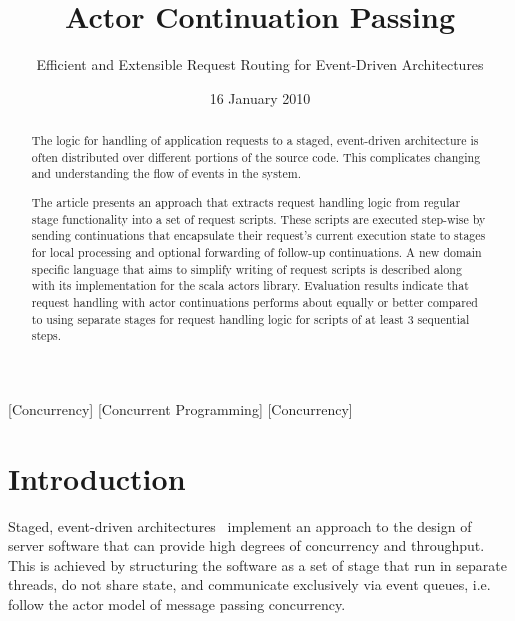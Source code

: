\documentclass[preprint]{sigplanconf}
\begin{document}
\title{Actor Continuation Passing}
\subtitle{Efficient and Extensible Request Routing for Event-Driven Architectures}


\date{16 January 2010}

\maketitle

\begin{abstract} The logic for handling of application requests to a staged, event-driven
architecture is often distributed over different portions of the source code. This complicates
changing and understanding the flow of events in the system.

The article presents an approach that extracts request handling logic from regular stage
functionality into a set of request scripts. These scripts are executed step-wise by sending
continuations that encapsulate their request's current execution state to stages for local
processing and optional forwarding of follow-up continuations. A new domain specific language that
aims to simplify writing of request scripts is described along with its implementation for the scala
actors library. Evaluation results indicate that request handling with actor continuations performs
about equally or better compared to using separate stages for request handling logic for scripts of
at least 3 sequential steps.
\end{abstract}

[Concurrency]         
[Concurrent Programming]         
[Concurrency]



\section{Introduction}             

Staged, event-driven architectures~\cite{Welsh:2009} implement an approach to the design of server
software that can provide high degrees of concurrency and throughput. This is achieved by
structuring the software as a set of stage that run in separate threads, do not share state, and
communicate exclusively via event queues, i.e. follow the actor model of message passing
concurrency.
\end{document}
